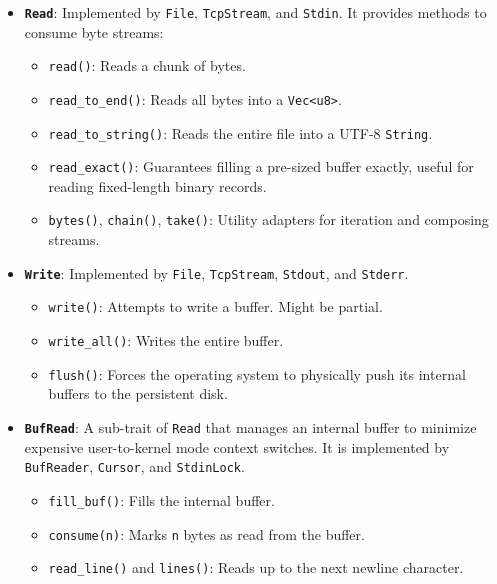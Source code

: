 \begin{itemize}
    \item \textbf{\texttt{Read}}: Implemented by \texttt{File}, \texttt{TcpStream}, and \texttt{Stdin}. It provides methods to consume byte streams:
    \begin{itemize}
        \item \texttt{read()}: Reads a chunk of bytes.
        \item \texttt{read\_to\_end()}: Reads all bytes into a \texttt{Vec<u8>}.
        \item \texttt{read\_to\_string()}: Reads the entire file into a UTF-8 \texttt{String}.
        \item \texttt{read\_exact()}: Guarantees filling a pre-sized buffer exactly, useful for reading fixed-length binary records.
        \item \texttt{bytes()}, \texttt{chain()}, \texttt{take()}: Utility adapters for iteration and composing streams.
    \end{itemize}

    \item \textbf{\texttt{Write}}: Implemented by \texttt{File}, \texttt{TcpStream}, \texttt{Stdout}, and \texttt{Stderr}. 
    \begin{itemize}
        \item \texttt{write()}: Attempts to write a buffer. Might be partial.
        \item \texttt{write\_all()}: Writes the entire buffer.
        \item \texttt{flush()}: Forces the operating system to physically push its internal buffers to the persistent disk. 
    \end{itemize}

    \item \textbf{\texttt{BufRead}}: A sub-trait of \texttt{Read} that manages an internal buffer to minimize expensive user-to-kernel mode context switches. It is implemented by \texttt{BufReader}, \texttt{Cursor}, and \texttt{StdinLock}.
    \begin{itemize}
        \item \texttt{fill\_buf()}: Fills the internal buffer.
        \item \texttt{consume(n)}: Marks \texttt{n} bytes as read from the buffer.
        \item \texttt{read\_line()} and \texttt{lines()}: Reads up to the next newline character.
    \end{itemize}


\end{itemize}
